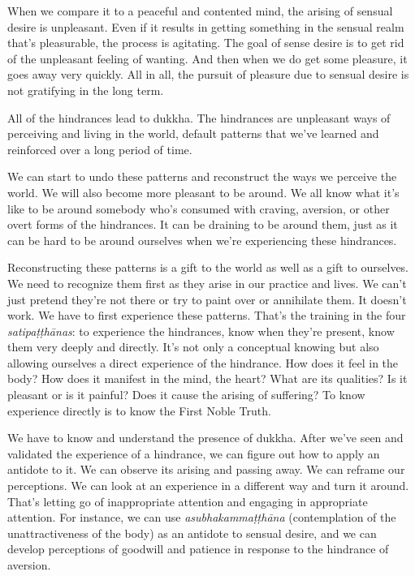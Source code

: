 When we compare it to a peaceful and contented mind, the arising of sensual desire is unpleasant. Even if it results in getting something in the sensual realm that's pleasurable, the process is agitating. The goal of sense desire is to get rid of the unpleasant feeling of wanting. And then when we do get some pleasure, it goes away very quickly. All in all, the pursuit of pleasure due to sensual desire is not gratifying in the long term.

All of the hindrances lead to dukkha. The hindrances are unpleasant ways of perceiving and living in the world, default patterns that we've learned and reinforced over a long period of time.

We can start to undo these patterns and reconstruct the ways we perceive the world. We will also become more pleasant to be around. We all know what it's like to be around somebody who's consumed with craving, aversion, or other overt forms of the hindrances. It can be draining to be around them, just as it can be hard to be around ourselves when we're experiencing these hindrances.

Reconstructing these patterns is a gift to the world as well as a gift to ourselves. We need to recognize them first as they arise in our practice and lives. We can't just pretend they're not there or try to paint over or annihilate them. It doesn't work. We have to first experience these patterns. That's the training in the four \emph{satipaṭṭhānas}: to experience the hindrances, know when they're present, know them very deeply and directly. It's not only a conceptual knowing but also allowing ourselves a direct experience of the hindrance. How does it feel in the body? How does it manifest in the mind, the heart? What are its qualities? Is it pleasant or is it painful? Does it cause the arising of suffering? To know experience directly is to know the First Noble Truth.

We have to know and understand the presence of dukkha. After we've seen and validated the experience of a hindrance, we can figure out how to apply an antidote to it. We can observe its arising and passing away. We can reframe our perceptions. We can look at an experience in a different way and turn it around. That's letting go of inappropriate attention and engaging in appropriate attention. For instance, we can use \emph{asubhakammaṭṭhāna} (contemplation of the unattractiveness of the body) as an antidote to sensual desire, and we can develop perceptions of goodwill and patience in response to the hindrance of aversion.


